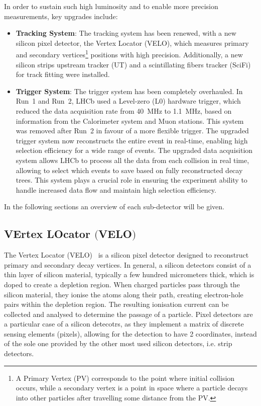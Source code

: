 In order to sustain such high luminosity and to enable more precision measurements, key upgrades include:
\begin{itemize}
\item \textbf{Tracking System}: The tracking system has been renewed, with a new silicon pixel detector, the Vertex Locator (VELO), which measures primary and secondary vertices\footnote{A Primary Vertex (PV) corresponds to the point where initial collision occurs, while a secondary vertex is a point in space where a particle decays into other particles after travelling some distance from the PV.} positions with high precision. Additionally, a new silicon strips upstream tracker (UT) and a scintillating fibers tracker (SciFi) for track fitting were installed.

\item \textbf{Trigger System}: The trigger system has been completely overhauled. In Run~1 and Run~2, LHCb used a Level-zero (L$0$) hardware trigger, which reduced the data acquisition rate from \SI{40}{\mega\hertz} to \SI{1.1}{\mega\hertz}, based on information from the Calorimeter system and Muon stations. This system was removed after Run~2 in favour of a more flexible trigger. The upgraded trigger system now reconstructs the entire event in real-time, enabling high selection efficiency for a wide range of events. The upgraded data acquisition system allows LHCb to process all the data from each collision in real time, allowing to select which events to save based on fully reconstructed decay trees. This system plays a crucial role in ensuring the experiment ability to handle increased data flow and maintain high selection efficiency.
\end{itemize}
In the following sections an overview of each sub-detector will be given.

\subsection[VErtex LOcator]{VErtex LOcator $\bigl($VELO$\bigr)$}\label{sec:velo}
The Vertex Locator (VELO)~\cite{Bediaga:2013tje} is a silicon pixel detector designed to reconstruct primary and secondary decay vertices. In general, a silicon detectors consist of a thin layer of silicon material, typically a few hundred micrometers thick, which is doped to create a depletion region. When charged particles pass through the silicon material, they ionise the atoms along their path, creating electron-hole pairs within the depletion region. The resulting ionisation current can be collected and analysed to determine the passage of a particle. Pixel detectors are a particular case of a  silicon detecotrs, as they implement a matrix of discrete sensing elements (pixels), allowing for the detection to have 2 coordinates, instead of the sole one provided by the other most used silicon detectors, i.e. strip detectors. 

